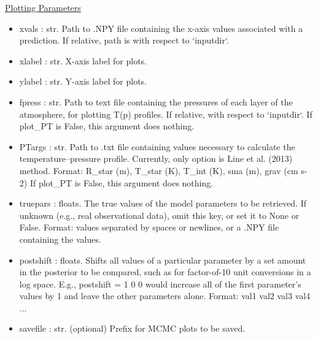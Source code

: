 \documentclass[letterpaper, 12pt]{article}
\begin{document}
\noindent \underline{Plotting Parameters}
\begin{itemize}
\item xvals      : str.  Path to .NPY file containing the x-axis values 
                         associated with a prediction.
                         If relative, path is with respect to `inputdir`.
\item xlabel     : str.  X-axis label for plots.
\item ylabel     : str.  Y-axis label for plots.
\item fpress     : str.  Path to text file containing the pressures of each 
                         layer of the atmosphere, for plotting T(p) profiles.
                         If relative, with respect to `inputdir`.
                         If plot\_PT is False, this argument does nothing.
\item PTargs     : str.  Path to .txt file containing values necessary to 
                   calculate the temperature--pressure profile.
                   Currently, only option is Line et al. (2013) method.
                   Format: R\_star (m), T\_star (K), T\_int (K), 
                           sma (m), grav (cm s-2)
                   If plot\_PT is False, this argument does nothing.
\item truepars   : floats.  The true values of the model parameters to be 
                         retrieved.  If unknown (e.g., real observational data),
                         omit this key, or set it to None or False.
                         Format: values separated by spaces or newlines, or 
                                 a .NPY file containing the values.
\item postshift   : floats. Shifts all values of a particular parameter by a 
                          set amount in the posterior to be compared, such as 
                          for factor-of-10 unit conversions in a log space.
                    E.g., postshift = 1 0 0 would increase all of the first 
                    parameter's values by 1 and leave the other parameters 
                    alone.
                    Format: val1 val2 val3 val4 ...
\item savefile   : str.  (optional) Prefix for MCMC plots to be saved.
\end{itemize}
\end{document}
